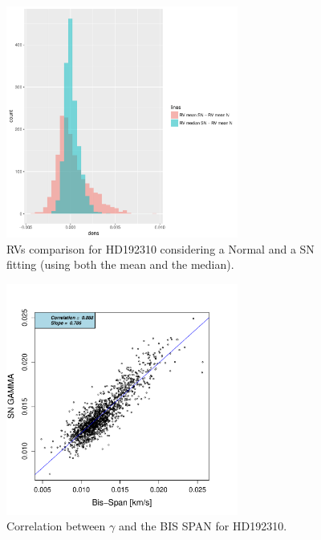 \documentclass[11pt, oneside]{article}
\begin{document}
\iffalse
%
\begin{figure}[htbp]
   \centering
\includegraphics[height = 3in]{[0]HD19231_HistogramsDiff.pdf} 
   \caption{RVs comparison for HD192310 considering a Normal and a SN fitting (using both the mean and the median).}
   \label{fig:HD192310:RV}
\end{figure}
%
\begin{figure}[htbp]
   \centering
\includegraphics[height = 3in]{HD19231_[2]gamma_vs_bisspan.pdf} 
   \caption{Correlation between $\gamma$ and the BIS SPAN for HD192310.}
   \label{fig:Gliese785:corr.gamma}
\end{figure}
%
\end{document}
